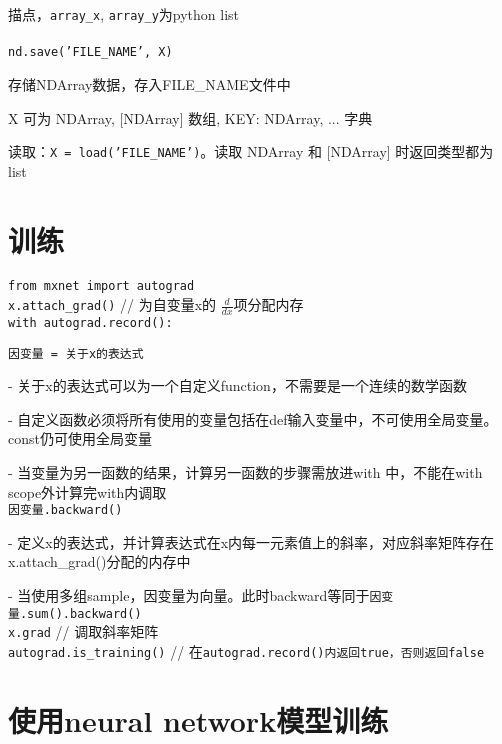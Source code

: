 \documentclass[UTF8]{ctexart}
\begin{document}
  描点，\texttt{array\_x}, \texttt{array\_y}为python list\\\\
\texttt{nd.save('FILE\_NAME', X)}

  存储NDArray数据，存入FILE\_NAME文件中

  X 可为 NDArray, [NDArray] 数组, {KEY: NDArray, ...} 字典
  
  读取：\texttt{X = load('FILE\_NAME')}。读取 NDArray 和 [NDArray] 时返回类型都为list

\section{训练}

\noindent \texttt{from mxnet import autograd}\\
\texttt{x.attach\_grad()} // 为自变量x的 $\frac{d }{d x} $项分配内存\\
\texttt{with autograd.record():}

  \texttt{因变量 = 关于x的表达式}
  
  - 关于x的表达式可以为一个自定义function，不需要是一个连续的数学函数
  
  - 自定义函数必须将所有使用的变量包括在def输入变量中，不可使用全局变量。const仍可使用全局变量
  
  - 当变量为另一函数的结果，计算另一函数的步骤需放进with 中，不能在with scope外计算完with内调取\\
\texttt{因变量.backward()}
  
  - 定义x的表达式，并计算表达式在x内每一元素值上的斜率，对应斜率矩阵存在x.attach\_grad()分配的内存中
  
  - 当使用多组sample，因变量为向量。此时backward等同于\texttt{因变量.sum().backward()}\\
\texttt{x.grad} // 调取斜率矩阵\\
\texttt{autograd.is\_training()} // 在\texttt{autograd.record()内返回true，否则返回false}

\section{使用neural network模型训练}
\end{document}
